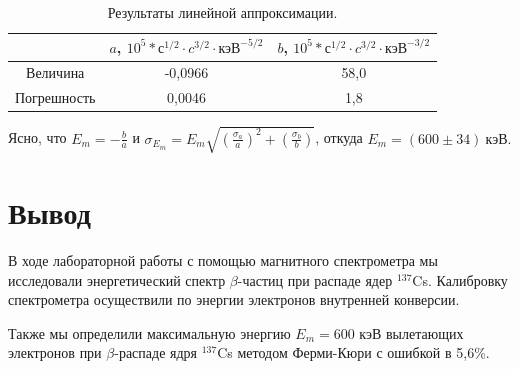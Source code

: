 \documentclass[a4paper, 12pt]{article}%
\begin{document}
\begin{enumerate}
\begin{center}
		\begin{table}
			\caption{Результаты линейной аппроксимации.}
			\label{table:Emax}
			\begin{tabular}{|c|c|c|}
				\hline
				& $a$, $10^5 * \text{с}^{1/2} \cdot {c^{3/2}} \cdot\text{кэВ}^{-5/2}$ & $b$, $10^5 * \text{с}^{1/2} \cdot {c^{3/2}} \cdot\text{кэВ}^{-3/2}$ \\ \hline
							Величина    & -0,0966                                                        & 58,0                                                                     \\ \hline
							Погрешность & 0,0046                                                         & 1,8                                                                     \\ \hline
						\end{tabular}
		\end{table}
\end{center}

Ясно, что $E_m = - \frac{b}{a}$ и $\sigma_{E_m} = E_m \sqrt{\left(\frac{\sigma_a}{a}\right)^2 + \left(\frac{\sigma_b}{b}\right)}$, откуда $E_m =(600 \pm 34) \ \text{кэВ}.$

\end{enumerate}

\section{Вывод}
	В ходе лабораторной работы с помощью магнитного спектрометра мы исследовали энергетический спектр $\beta$-частиц при распаде ядер $^{137}$Cs. Калибровку спектрометра осуществили по энергии электронов внутренней конверсии.
	
	Также мы определили максимальную энергию $E_m = 600$ кэВ вылетающих электронов при $\beta$-распаде ядря $^{137}$Cs методом Ферми-Кюри  с ошибкой в 5,6\%.
\end{document}
